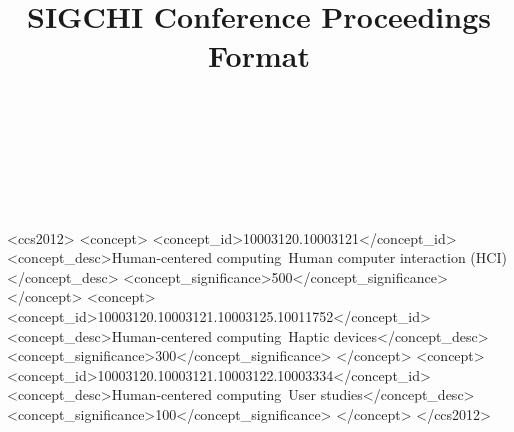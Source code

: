 \documentclass{sigchi}
\def\plaintitle{SIGCHI Conference Proceedings Format}
\begin{document}
\title{\plaintitle}

\author{%
  \\
  \\
  \\
  \\
}

\maketitle

\newcommand{\note}[2]{\textcolor{#1}{[#2]}}
\newcommand{\ck}[1]{\note{blue}{Mick: #1}}
\newcommand{\todo}[1]{\note{red}{Todo: #1}}




\begin{CCSXML}
<ccs2012>
    <concept>
        <concept_id>10003120.10003121</concept_id>
        <concept_desc>Human-centered computing~Human computer interaction (HCI)</concept_desc>
        <concept_significance>500</concept_significance>
    </concept>
    <concept>
        <concept_id>10003120.10003121.10003125.10011752</concept_id>
        <concept_desc>Human-centered computing~Haptic devices</concept_desc>
        <concept_significance>300</concept_significance>
    </concept>
    <concept>
        <concept_id>10003120.10003121.10003122.10003334</concept_id>
        <concept_desc>Human-centered computing~User studies</concept_desc>
        <concept_significance>100</concept_significance>
    </concept>
</ccs2012>
\end{CCSXML}

\end{document}
